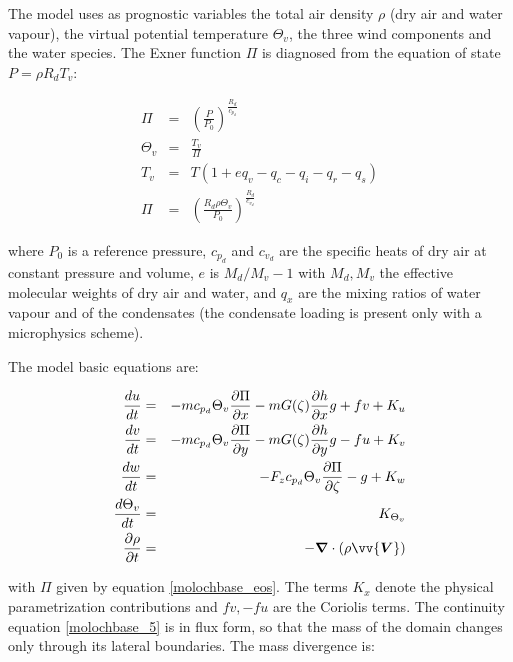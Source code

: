 The model uses as prognostic variables the total air density $\rho$
(dry air and water vapour), the virtual potential temperature $\Theta_v$,
the three wind components and the water species. The Exner function $\Pi$
is diagnosed from the equation of state $P = \rho R_d T_v$:

\begin{eqnarray}
  \Pi &=& \left(\frac{P}{P_0}\right)^{\frac{R_d}{c_{p_d}}} \\
  \Theta_v &=& \frac{T_v}{\Pi} \\
  T_v &=& T \left( 1 + e q_v - q_c - q_i - q_r - q_s \right) \\
  \label{molochbase_eos}
  \Pi &=& \left(\frac{R_d \rho \Theta_v}{P_0}\right)^{\frac{R_d}{c_{v_d}}}
\end{eqnarray}

where $P_0$ is a reference pressure, $c_{p_d}$ and $c_{v_d}$ are the specific
heats of dry air at constant pressure and volume, $e$ is $M_d/M_v - 1$ with
$M_d,M_v$ the effective molecular weights of dry air and water, and $q_x$ are
the mixing ratios of water vapour and of the condensates (the condensate
loading is present only with a microphysics scheme).

The model basic equations are:

\begin{eqnarray}
  \label{molochbase_1}
  \frac{du}{dt} &=& - m c_{p_d}\Theta_v \frac{\partial \Pi}{\partial x}
                 -  m G(\zeta) \frac{\partial h}{\partial x} g + fv + K_u \\
  \label{molochbase_2}
  \frac{dv}{dt} &=& - m c_{p_d}\Theta_v \frac{\partial \Pi}{\partial y}
                 - m G(\zeta) \frac{\partial h}{\partial y} g - fu + K_v \\
  \label{molochbase_3}
  \frac{dw}{dt} &=& - F_z c_{p_d}\Theta_v \frac{\partial \Pi}{\partial \zeta}
                 - g + K_w \\
  \label{molochbase_4}
  \frac{d\Theta_{v}}{dt} &=& K_{\Theta_v} \\
  \label{molochbase_5}
  \frac{\partial \rho}{\partial t} &=& - \bm{\nabla} \cdot (\rho \vv{\bm{V}})
\end{eqnarray}

with $\Pi$ given by equation \ref{molochbase_eos}. The terms $K_x$ denote the
physical parametrization contributions and $fv,-fu$ are the Coriolis terms.
The continuity equation \ref{molochbase_5} is in flux form, so that the mass
of the domain changes only through its lateral boundaries. The mass divergence
is:

